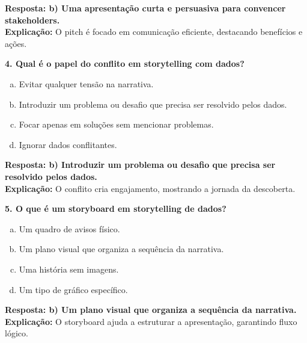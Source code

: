 \begin{SolvedBox}[orange]
\textbf{Resposta: b) Uma apresentação curta e persuasiva para convencer stakeholders.} \\
\textbf{Explicação:} O pitch é focado em comunicação eficiente, destacando benefícios e ações.

\textbf{4. Qual é o papel do conflito em storytelling com dados?}

\begin{enumerate}[a)]
  \item Evitar qualquer tensão na narrativa.
  \item Introduzir um problema ou desafio que precisa ser resolvido pelos dados.
  \item Focar apenas em soluções sem mencionar problemas.
  \item Ignorar dados conflitantes.
\end{enumerate}

\textbf{Resposta: b) Introduzir um problema ou desafio que precisa ser resolvido pelos dados.} \\
\textbf{Explicação:} O conflito cria engajamento, mostrando a jornada da descoberta.

\textbf{5. O que é um storyboard em storytelling de dados?}

\begin{enumerate}[a)]
  \item Um quadro de avisos físico.
  \item Um plano visual que organiza a sequência da narrativa.
  \item Uma história sem imagens.
  \item Um tipo de gráfico específico.
\end{enumerate}

\textbf{Resposta: b) Um plano visual que organiza a sequência da narrativa.} \\
\textbf{Explicação:} O storyboard ajuda a estruturar a apresentação, garantindo fluxo lógico.
\end{SolvedBox}

